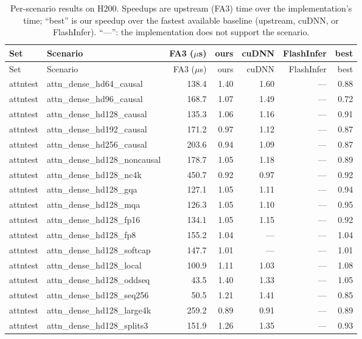 \begin{longtable}{@{}llrrrrr@{}}
\caption{Per-scenario results on H200. Speedups are upstream (FA3) time over the implementation's time; ``best'' is our speedup over the fastest available baseline (upstream, cuDNN, or FlashInfer). ``---'': the implementation does not support the scenario.}\label{tab:per-scenario-hopper}\\
\toprule Set & Scenario & FA3 ($\mu$s) & ours & cuDNN & FlashInfer & best \\ \midrule \endfirsthead
\toprule Set & Scenario & FA3 ($\mu$s) & ours & cuDNN & FlashInfer & best \\ \midrule \endhead
\bottomrule \endfoot
attntest & attn\_dense\_hd64\_causal & 138.4 & 1.40 & 1.60 & --- & 0.88 \\
attntest & attn\_dense\_hd96\_causal & 168.7 & 1.07 & 1.49 & --- & 0.72 \\
attntest & attn\_dense\_hd128\_causal & 135.3 & 1.06 & 1.16 & --- & 0.91 \\
attntest & attn\_dense\_hd192\_causal & 171.2 & 0.97 & 1.12 & --- & 0.87 \\
attntest & attn\_dense\_hd256\_causal & 203.6 & 0.94 & 1.09 & --- & 0.87 \\
attntest & attn\_dense\_hd128\_noncausal & 178.7 & 1.05 & 1.18 & --- & 0.89 \\
attntest & attn\_dense\_hd128\_nc4k & 450.7 & 0.92 & 0.97 & --- & 0.92 \\
attntest & attn\_dense\_hd128\_gqa & 127.1 & 1.05 & 1.11 & --- & 0.94 \\
attntest & attn\_dense\_hd128\_mqa & 126.3 & 1.05 & 1.10 & --- & 0.95 \\
attntest & attn\_dense\_hd128\_fp16 & 134.1 & 1.05 & 1.15 & --- & 0.92 \\
attntest & attn\_dense\_hd128\_fp8 & 155.2 & 1.04 & --- & --- & 1.04 \\
attntest & attn\_dense\_hd128\_softcap & 147.7 & 1.01 & --- & --- & 1.01 \\
attntest & attn\_dense\_hd128\_local & 100.9 & 1.11 & 1.03 & --- & 1.08 \\
attntest & attn\_dense\_hd128\_oddseq & 43.5 & 1.40 & 1.33 & --- & 1.05 \\
attntest & attn\_dense\_hd128\_seq256 & 50.5 & 1.21 & 1.41 & --- & 0.85 \\
attntest & attn\_dense\_hd128\_large4k & 259.2 & 0.89 & 0.91 & --- & 0.89 \\
attntest & attn\_dense\_hd128\_splits3 & 151.9 & 1.26 & 1.35 & --- & 0.93 \\

\end{longtable}
